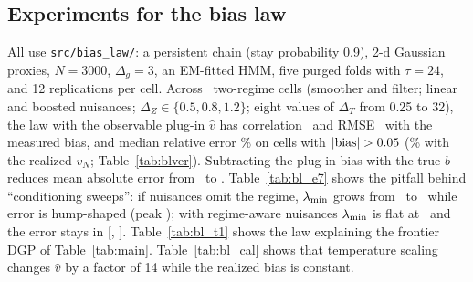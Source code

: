 \subsection{Experiments for the bias law}
\label{app:biaslaw_exp}
All use \texttt{src/bias\_law/}: a persistent chain (stay probability 0.9), 2-d Gaussian proxies, $N=3000$, $\Delta_g=3$, an EM-fitted HMM, five purged folds with $\tau=24$, and 12 replications per cell. Across \BLCells\ two-regime cells (smoother and filter; linear and boosted nuisances; $\Delta_Z\in\{0.5,0.8,1.2\}$; eight values of $\Delta_T$ from 0.25 to 32), the law with the observable plug-in $\hat v$ has correlation \BLCorr\ and RMSE \BLRmse\ with the measured bias, and median relative error \BLMedRel\% on cells with $|{\rm bias}|>0.05$ (\BLMedRelTrue\% with the realized $v_N$; Table~\ref{tab:blver}). Subtracting the plug-in bias with the true $b$ reduces mean absolute error from \BLAdjBefore\ to \BLAdjAfter. Table~\ref{tab:bl_e7} shows the pitfall behind ``conditioning sweeps'': if nuisances omit the regime, $\lambda_{\min}$ grows from \ESevLamLo\ to \ESevLamHi\ while error is hump-shaped (peak \ESevErrPeak); with regime-aware nuisances $\lambda_{\min}$ is flat at \ESevRegLam\ and the error stays in [\ESevRegLo, \ESevRegHi]. Table~\ref{tab:bl_t1} shows the law explaining the frontier DGP of Table~\ref{tab:main}. Table~\ref{tab:bl_cal} shows that temperature scaling changes $\hat v$ by a factor of 14 while the realized bias is constant.
\begin{table}[h]\centering\footnotesize
\caption{Agreement between measured bias and the law (bias-law experiments E1--E2).}\label{tab:blver}

\end{table}
\begin{table}[h]\centering\footnotesize
\caption{Conditioning sweep on the frontier DGP ($\Delta_Z=1.5$): the role of regime-aware nuisances.}\label{tab:bl_e7}

\end{table}
\begin{table}[h]\centering\footnotesize
\caption{Frontier DGP (30 replications, $N=1200$): excess bias of soft conditioning over the oracle state, and the law.}\label{tab:bl_t1}

\end{table}
\begin{table}[h]\centering\footnotesize
\caption{Temperature scaling of the posterior ($K=2$, boosted nuisances, 20 replications, $\Delta_Z=0.8$, $\Delta_T=2$).}\label{tab:bl_cal}

\end{table}
\begin{table}[h]\centering\footnotesize
\caption{When can $b$ be learned? Posterior-DML versus a correctly specified joint Markov-switching MLE and proximal 2SLS with a negative-control outcome (bias, RMSE in parentheses).}\label{tab:bl_ext}

\end{table}

